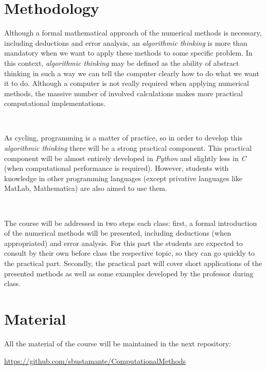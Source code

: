 \documentclass[a4,useAMS,usenatbib,usegraphicx,12pt]{article}
\begin{document}
\section*{Methodology}

Although a formal mathematical approach of the numerical methods is necessary, 
including deductions and error analysis, an \textit{algorithmic thinking} is more
than mandatory when we want to apply these methods to some specific problem. In
this context, \textit{algorithmic thinking} may be defined as the ability of 
abstract thinking in such a way we can tell the computer clearly how to do what 
we want it to do. Although a computer is not really required when applying 
numerical methods, the massive number of involved calculations makes more 
practical computational implementations.

\

As cycling, programming is a matter of practice, so in order to develop this 
\textit{algorithmic thinking} there will be a strong practical component. This 
practical component will be almost entirely developed in \textit{Python} and 
slightly less in \textit{C} (when computational performance is required). 
However, students with knowledge in other programming languages (except
privative languages like MatLab, Mathematica) are also aimed to use them.

\

The course will be addressed in two steps each class: first, a formal 
introduction of the numerical methods will be presented, including deductions 
(when appropriated) and error analysis. For this part the students are expected 
to consult by their own before class the respective topic, so they can go 
quickly to the practical part. Secondly, the practical part will cover short
applications of the presented methods as well as some examples developed by
the professor during class.

\section*{Material}

All the material of the course will be maintained in the next repository:

\url{ https://github.com/sbustamante/ComputationalMethods }
\end{document}
